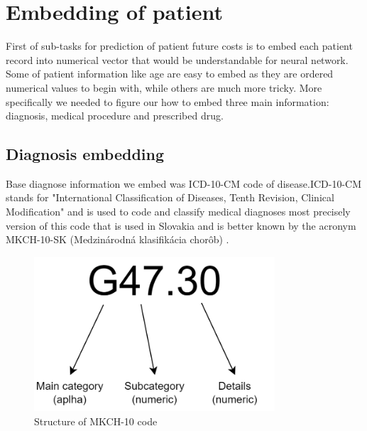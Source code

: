 
\section{Embedding of patient}
\label{embedding}

First of sub-tasks for prediction of patient future costs is to embed each patient record into numerical vector that would be understandable for neural network. Some of patient information like age are easy to embed as they are ordered numerical values to begin with, while others are much more tricky. More specifically we needed to figure our how to embed three main information: diagnosis, medical procedure and prescribed drug.

\subsection{Diagnosis embedding}

Base diagnose information we embed was ICD-10-CM code of disease.ICD-10-CM stands for "International Classification of Diseases, Tenth Revision, Clinical Modification" and is used to code and classify medical diagnoses \cite{cdcICD10CM} most precisely version of this code that is used in Slovakia and is better known by the acronym MKCH-10-SK (Medzinárodná klasifikácia chorôb) \cite{ncziMKCH}.\\

\begin{figure}[!h]
	\centering
	
	\includegraphics[width=0.8\textwidth]{images/ICD-10-CM.png}
	
	\caption{Structure of MKCH-10 code}
	\label{fig:icd-10-cm}
\end{figure}


